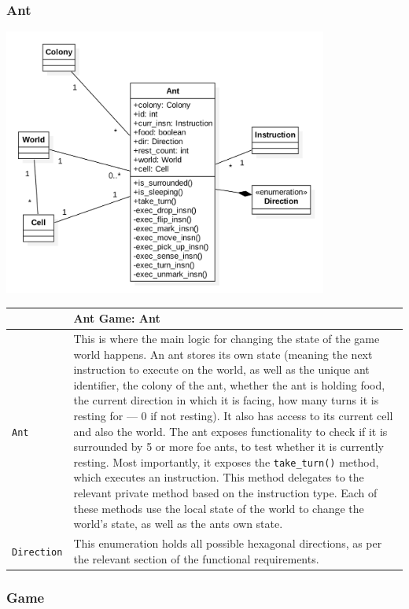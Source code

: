 \documentclass[11pt]{article}
\begin{document}
\subsubsection{Ant}

\begin{center}
\includegraphics[width=0.8\textwidth]{low-level-diagrams/class/ant.png}
\end{center}

\begin{longtable}[c]{@{}p{}p{}@{}}
\toprule
& Ant Game: Ant \tabularnewline
\midrule
\texttt{Ant} & This is where the main logic for changing the state of the game world happens. An ant stores its own state (meaning the next instruction to execute on the world, as well as the unique ant identifier, the colony of the ant, whether the ant is holding food, the current direction in which it is facing, how many turns it is resting for --- 0 if not resting). It also has access to its current cell and also the world. The ant exposes functionality to check if it is surrounded by 5 or more foe ants, to test whether it is currently resting. Most importantly, it exposes the \texttt{take\_turn()} method, which executes an instruction. This method delegates to the relevant private method based on the instruction type. Each of these methods use the local state of the world to change the world's state, as well as the ants own state. \tabularnewline
\texttt{Direction} & This enumeration holds all possible hexagonal directions, as per the relevant section of the functional requirements. \tabularnewline
\bottomrule
\end{longtable}

\subsubsection{Game}
\end{document}
